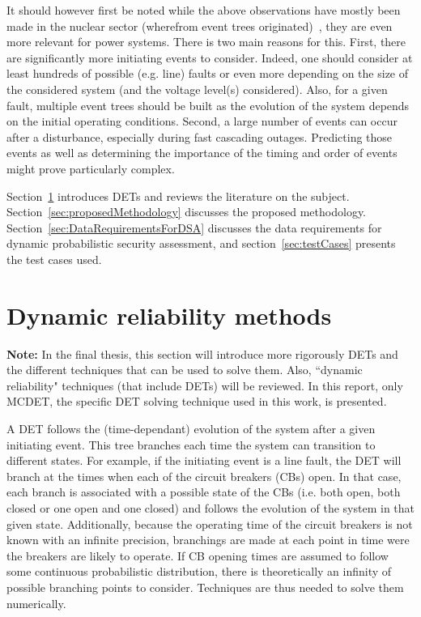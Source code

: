It should however first be noted while the above observations have mostly been made in the nuclear sector (wherefrom event trees originated)~\cite{LabeauTowards}, they are even more relevant for power systems. There is two main reasons for this. First, there are significantly more initiating events to consider. Indeed, one should consider at least hundreds of possible (e.g. line) faults or even more depending on the size of the considered system (and the voltage level(s) considered). Also, for a given fault, multiple event trees should be built as the evolution of the system depends on the initial operating conditions. Second, a large number of events can occur after a disturbance, especially during fast cascading outages. Predicting those events as well as determining the importance of the timing and order of events might prove particularly complex.

Section~\ref{sec:dynamicReliability} introduces DETs and reviews the literature on the subject. Section~\ref{sec:proposedMethodology} discusses the proposed methodology. Section~\ref{sec:DataRequirementsForDSA} discusses the data requirements for dynamic probabilistic security assessment, and section~\ref{sec:testCases} presents the test cases used.


\section{Dynamic reliability methods}
\label{sec:dynamicReliability}

\textbf{Note:} In the final thesis, this section will introduce more rigorously DETs and the different techniques that can be used to solve them. Also, ``dynamic reliability" techniques (that include DETs) will be reviewed. In this report, only MCDET, the specific DET solving technique used in this work, is presented.

A DET follows the (time-dependant) evolution of the system after a given initiating event. This tree branches each time the system can transition to different states. For example, if the initiating event is a line fault, the DET will branch at the times when each of the circuit breakers (CBs) open. In that case, each branch is associated with a possible state of the CBs (i.e. both open, both closed or one open and one closed) and follows the evolution of the system in that given state. Additionally, because the operating time of the circuit breakers is not known with an infinite precision, branchings are made at each point in time were the breakers are likely to operate. If CB opening times are assumed to follow some continuous probabilistic distribution, there is theoretically an infinity of possible branching points to consider. Techniques are thus needed to solve them numerically.

